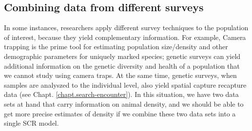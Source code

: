 \begin{comment}

Strauss paper....beth currently working on this 

In currently developing work, we propose a model that accounts for spatial variation in home range density and potential interactions between individuals' home ranges.  This model lets the activity centers follow an inhomogeneous Strauss process \citep{strauss:1975,handbook:2010}, which allows for spatial variation in the home range intensity, and includes a parameter that determines the strength of repulsion between home ranges.  We show via a simulation study that properly accounting for interactions between individuals can provide a substantial improvement in estimating population size.  For simulated data generated with interaction, the usual independence model has a significant bias for the population size, and generally has larger uncertainty for the population size than the proposed Strauss process model.

While the Strauss model is intuitive and shows great potential, it presents computational challenges.  First, the likelihood includes a high-dimensional integral that has no closed form.   Extending related work for categorical Markov random fields \citep{green:2002,smith:2006}, we develop an approximation to the Strauss likelihood which allows for posterior sampling.  Second, in our Bayesian analysis, the population size is treated as an unknown parameter to be updated using the data.  As the population size varies, so does the dimension of the likelihood, and thus the posterior.  We overcome this dimension-changing problem using an auxiliary variable scheme in the Markov chain Monte Carlo algorithm.  Our analysis of simulated data verifies that this computational approach leads to reliable inference.

\end{comment}

\subsection{Combining data from different surveys}
In some instances, researchers apply different survey techniques to the population of interest, because they yield complementary information. For example, 
Camera trapping is the prime tool for estimating population size/density and other demographic parameters for uniquely marked species; genetic surveys can yield additional information on the genetic diversity and health of a population that we cannot study using camera traps. At the same time, genetic surveys, when samples are analyszed to the individual level, also yield spatial capture recapture data (see Chapt. \ref{chapt.search-encounter}). In this situation, we have two data sets at hand that carry information on animal density, and we should be able to get more precise estimates of density if we combine these two data sets into a single SCR model.

